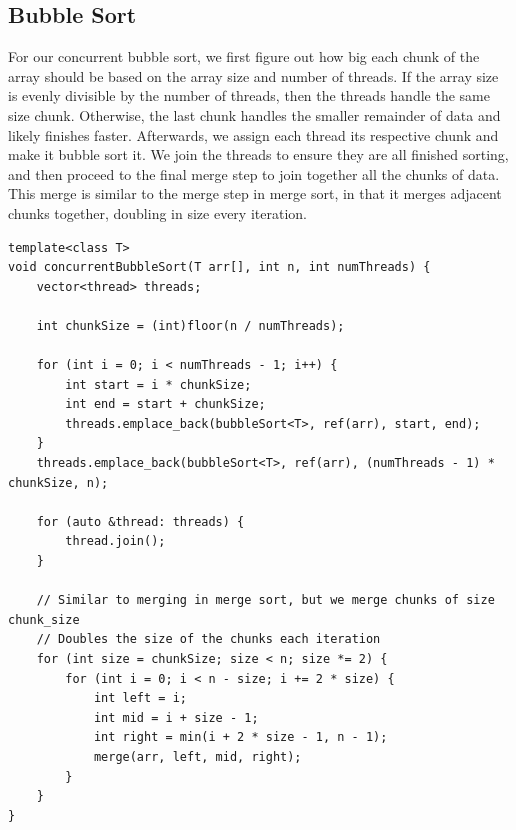 \documentclass[conference]{IEEEtran}
\begin{document}
\subsection{Bubble Sort}
For our concurrent bubble sort, we first figure out how big each chunk of the array should be based on the array size and number of threads. If the array size is evenly divisible by the number of threads, then the threads handle the same size chunk. Otherwise, the last chunk handles the smaller remainder of data and likely finishes faster. Afterwards, we assign each thread its respective chunk and make it bubble sort it. We join the threads to ensure they are all finished sorting, and then proceed to the final merge step to join together all the chunks of data. This merge is similar to the merge step in merge sort, in that it merges adjacent chunks together, doubling in size every iteration.
\\

\begin{lstlisting}
template<class T>
void concurrentBubbleSort(T arr[], int n, int numThreads) {
    vector<thread> threads;

    int chunkSize = (int)floor(n / numThreads);

    for (int i = 0; i < numThreads - 1; i++) {
        int start = i * chunkSize;
        int end = start + chunkSize;
        threads.emplace_back(bubbleSort<T>, ref(arr), start, end);
    }
    threads.emplace_back(bubbleSort<T>, ref(arr), (numThreads - 1) * chunkSize, n);

    for (auto &thread: threads) {
        thread.join();
    }

    // Similar to merging in merge sort, but we merge chunks of size chunk_size
    // Doubles the size of the chunks each iteration
    for (int size = chunkSize; size < n; size *= 2) {
        for (int i = 0; i < n - size; i += 2 * size) {
            int left = i;
            int mid = i + size - 1;
            int right = min(i + 2 * size - 1, n - 1);
            merge(arr, left, mid, right);
        }
    }
}
\end{lstlisting}
\end{document}

